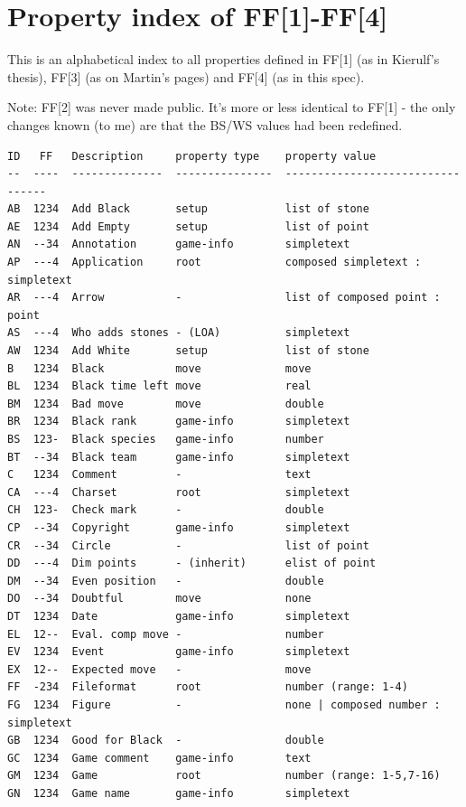 \newpage

\section{Property index of
FF{[}1{]}-FF{[}4{]}}\label{property-index-of-ff1-ff4}

This is an alphabetical index to all properties defined in FF{[}1{]} (as
in Kierulf's thesis), FF{[}3{]} (as on Martin's pages) and FF{[}4{]} (as
in this spec).

Note: FF{[}2{]} was never made public. It's more or less identical to
FF{[}1{]} - the only changes known (to me) are that the BS/WS values had
been redefined.

\begin{verbatim}
ID   FF   Description     property type    property value
--  ----  --------------  ---------------  ---------------------------------
AB  1234  Add Black       setup            list of stone
AE  1234  Add Empty       setup            list of point
AN  --34  Annotation      game-info        simpletext
AP  ---4  Application     root             composed simpletext : simpletext
AR  ---4  Arrow           -                list of composed point : point
AS  ---4  Who adds stones - (LOA)          simpletext
AW  1234  Add White       setup            list of stone
B   1234  Black           move             move
BL  1234  Black time left move             real
BM  1234  Bad move        move             double
BR  1234  Black rank      game-info        simpletext
BS  123-  Black species   game-info        number
BT  --34  Black team      game-info        simpletext
C   1234  Comment         -                text
CA  ---4  Charset         root             simpletext
CH  123-  Check mark      -                double
CP  --34  Copyright       game-info        simpletext
CR  --34  Circle          -                list of point
DD  ---4  Dim points      - (inherit)      elist of point
DM  --34  Even position   -                double
DO  --34  Doubtful        move             none
DT  1234  Date            game-info        simpletext
EL  12--  Eval. comp move -                number
EV  1234  Event           game-info        simpletext
EX  12--  Expected move   -                move
FF  -234  Fileformat      root             number (range: 1-4)
FG  1234  Figure          -                none | composed number : simpletext
GB  1234  Good for Black  -                double
GC  1234  Game comment    game-info        text
GM  1234  Game            root             number (range: 1-5,7-16)
GN  1234  Game name       game-info        simpletext

\end{verbatim}
